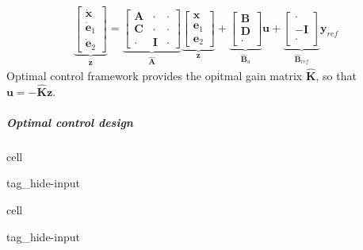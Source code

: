 \documentclass[letterpaper,10pt,english]{jupyterBook}
\begin{document}
\begin{equation*}
\begin{split}\underbrace{\begin{bmatrix} \dot{\mathbf{x}} \\ \dot{\mathbf{e}}_1 \\ \dot{\mathbf{e}}_2 \end{bmatrix}}_{\dot{\mathbf{z}}} = \underbrace{\begin{bmatrix} \mathbf{A} & \cdot & \cdot \\ \mathbf{C} & \cdot & \cdot \\ \cdot & \mathbf{I} & \cdot \end{bmatrix}}_{\hat{\mathbf{A}}} \underbrace{\begin{bmatrix} \mathbf{x} \\ \mathbf{e}_1 \\ \mathbf{e}_2 \end{bmatrix}}_{\mathbf{z}} + \underbrace{\begin{bmatrix} \mathbf{B} \\ \mathbf{D} \\ \cdot \end{bmatrix}}_{\hat{\mathbf{B}}_u} \mathbf{u} + \underbrace{\begin{bmatrix} \cdot \\ -\mathbf{I} \\ \cdot \end{bmatrix}}_{\hat{\mathbf{B}}_{ref}} \mathbf{y}_{ref}\end{split}
\end{equation*}
\sphinxAtStartPar
Optimal control framework provides the opitmal gain matrix \(\hat{\mathbf{K}}\), so that \(\mathbf{u} = - \hat{\mathbf{K}} \mathbf{z}\).


\subparagraph{Optimal control design}
\label{\detokenize{ch/control/optimal-control-ref-tracking-example:id1}}
\begin{sphinxuseclass}{cell}
\begin{sphinxuseclass}{tag_hide-input}
\end{sphinxuseclass}
\end{sphinxuseclass}
\begin{sphinxuseclass}{cell}
\begin{sphinxuseclass}{tag_hide-input}
\end{sphinxuseclass}
\end{sphinxuseclass}
\end{document}
